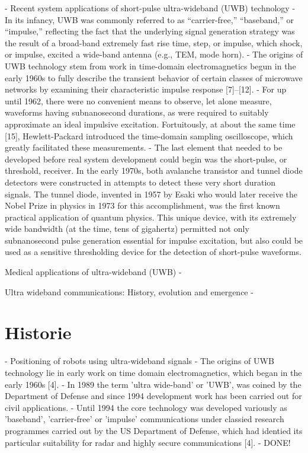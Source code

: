 \cite{fontana2004recent}
	- Recent system applications of short-pulse ultra-wideband (UWB) technology	
	- In its infancy, UWB was commonly referred to as “carrier-free,” “baseband,” or “impulse,” reflecting the fact that the underlying signal generation strategy was the result of a broad-band extremely fast rise time, step, or impulse, which shock, or impulse, excited a wide-band antenna (e.g., TEM, mode horn).
	- The origins of UWB technology stem from work in time-domain electromagnetics begun in the early 1960s to fully describe the transient behavior of certain classes of microwave networks by examining their characteristic impulse response [7]–[12].
	- For up until 1962, there were no convenient means to observe, let alone measure, waveforms having subnanosecond durations, as were required to suitably approximate an ideal impulsive excitation. Fortuitously, at about the same time [15], Hewlett-Packard introduced the time-domain sampling oscilloscope, which greatly facilitated these measurements.
	- The last element that needed to be developed before real system development could begin was the short-pulse, or threshold, receiver. In the early 1970s, both avalanche transistor and tunnel diode detectors were constructed in attempts to detect these very short duration signals. The tunnel diode, invented in 1957 by Esaki who would later receive the Nobel Prize in physics in 1973 for this accomplishment, was the first known practical application of quantum physics. This unique device, with its extremely wide bandwidth (at the time, tens of gigahertz) permitted not only subnanosecond pulse generation essential for impulse excitation, but also could be used as a sensitive thresholding device for the detection of short-pulse waveforms.
	
Medical applications of ultra-wideband (UWB)
	- \cite{pan2007medical}
	
Ultra wideband communications: History, evolution and emergence
	- \cite{lakkundi2006ultra}



\section{Historie}

\cite{eltaher2004positioning}
	- Positioning of robots using ultra-wideband signals
	- The origins of UWB technology lie in early work on time domain electromagnetics, which began in the early 1960s [4].
	- In 1989 the term 'ultra wide-band' or 'UWB', was coined by the Department of Defense and since 1994 development work has been carried out for civil applications.
	- Until 1994 the core technology was developed variously as 'baseband', 'carrier-free' or 'impulse' communications under classied research programmes carried out by the US Department of Defense, which had identied its particular suitability for radar and highly secure communications [4].
	- DONE!

